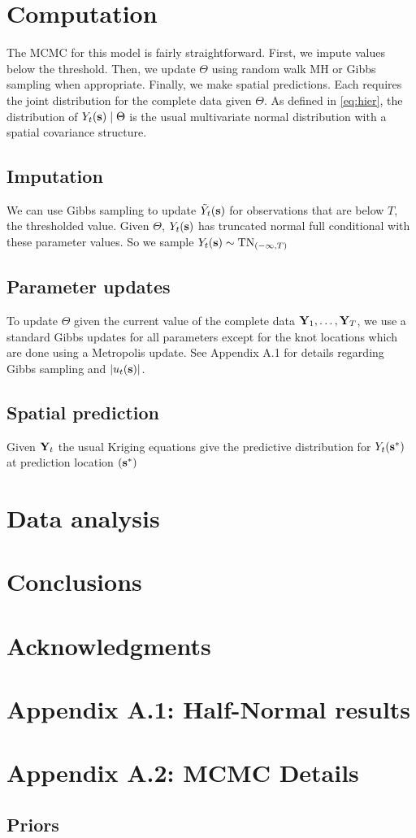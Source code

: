 \documentclass[11pt]{article}
\begin{document}
\section{Computation}\label{s:comp}
The MCMC for this model is fairly straightforward.
First, we impute values below the threshold.
Then, we update $\Theta$ using random walk MH or Gibbs sampling when appropriate.
Finally, we make spatial predictions.
Each requires the joint distribution for the complete data given $\Theta$.
As defined in \ref{eq:hier}, the distribution of $Y_t(\mbox{\bf s}) \mid \Theta$ is the usual multivariate normal distribution with a \Matern spatial covariance structure.

\subsection{Imputation}\label{s:impute}
We can use Gibbs sampling to update ${\tilde Y}_t(\mbox{\bf s})$ for observations that are below $T$, the thresholded value. Given $\Theta$, $Y_t(\mbox{\bf s})$ has truncated normal full conditional with these parameter values.
So we sample $Y_t(\mbox{\bf s}) \sim \text{TN}_{(-\infty, T)}$

\subsection{Parameter updates}\label{s:params}
To update $\Theta$ given the current value of the complete data $\mbox{\bf Y}_1, \ldots, \mbox{\bf Y}_T$, we use a standard Gibbs updates for all parameters except for the knot locations which are done using a Metropolis update.
See Appendix A.1 for details regarding Gibbs sampling and $|u_t(\mbox{\bf s})|$.

\subsection{Spatial prediction}\label{s:pred}
Given $\mbox{\bf Y}_t$ the usual Kriging equations give the predictive distribution for $Y_t(\mbox{\bf s}^*)$ at prediction location $(\mbox{\bf s}^*)$


\section{Data analysis}\label{s:analysis}


\section{Conclusions}\label{s:con}

\section*{Acknowledgments}

\section*{Appendix A.1: Half-Normal results}


\section*{Appendix A.2: MCMC Details}

\subsection*{Priors}





\end{document}
